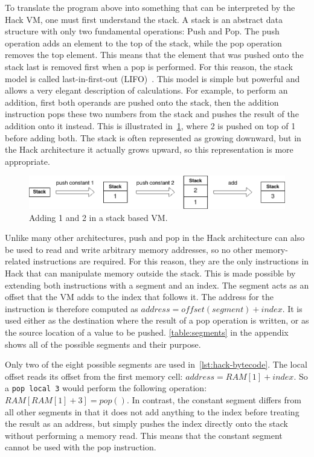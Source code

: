 To translate the program above into something that can be interpreted by the Hack VM, one must first understand the stack.
A stack is an abstract data structure with only two fundamental operations: Push and Pop.
The push operation adds an element to the top of the stack, while the pop operation removes the top element.
This means that the element that was pushed onto the stack last is removed first when a pop is performed.
For this reason, the stack model is called last-in-first-out (LIFO)~\cite{nisan2005}.
This model is simple but powerful and allows a very elegant description of calculations.
For example, to perform an addition, first both operands are pushed onto the stack, then the addition instruction pops these two numbers from the stack and pushes the result of the addition onto it instead.
This is illustrated in~\cref{fig:stack-add}, where 2 is pushed on top of 1 before adding both.
The stack is often represented as growing downward, but in the Hack architecture it actually grows upward, so this representation is more appropriate.

\begin{center}
  \begin{figure}[ht]
    \centering
    \includegraphics[width=14cm]{fig/stack-add.png}
    \caption{Adding 1 and 2 in a stack based VM.}
    \label{fig:stack-add}
  \end{figure}
\end{center}

Unlike many other architectures, push and pop in the Hack architecture can also be used to read and write arbitrary memory addresses, so no other memory-related instructions are required. For this reason, they are the only instructions in Hack that can manipulate memory outside the stack.
This is made possible by extending both instructions with a segment and an index. The segment acts as an offset that the VM adds to the index that follows it.
The address for the instruction is therefore computed as \(address=offset(segment)+index\).
It is used either as the destination where the result of a pop operation is written, or as the source location of a value to be pushed.
\cref{table:segments} in the appendix shows all of the possible segments and their purpose.

Only two of the eight possible segments are used in~\cref{lst:hack-bytecode}.
The local offset reads its offset from the first memory cell: \(address=RAM[1]+index\).
So a \verb+pop local 3+ would perform the following operation: \(RAM[RAM[1]+3] = pop()\).
In contrast, the constant segment differs from all other segments in that it does not add anything to the index before treating the result as an address, but simply pushes the index directly onto the stack without performing a memory read.
This means that the constant segment cannot be used with the pop instruction.

